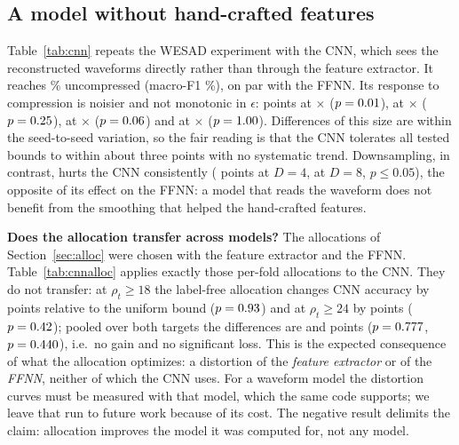 \documentclass[journal]{IEEEtran}
\begin{document}
\subsection{A model without hand-crafted features}
\begin{table}[t]
\caption{WESAD, 1-D CNN on raw reconstructed waveforms (LOSO, 15 subjects, \cnnNSeeds{} seeds).}
\label{tab:cnn}
\centering\scriptsize
\resizebox{\columnwidth}{!}{}
\end{table}
Table~\ref{tab:cnn} repeats the WESAD experiment with the CNN, which sees the reconstructed waveforms directly rather than through the feature extractor. It reaches \cnnRawAcc\% uncompressed (macro-F1 \cnnRawF\%), on par with the FFNN. Its response to compression is noisier and not monotonic in $\epsilon$: \cnnDAccEb{} points at \ratioEb$\times$ ($p=0.01$), \cnnDAccEd{} at \ratioEd$\times$ ($p=0.25$), \cnnDAccEe{} at \ratioEe$\times$ ($p=0.06$) and \cnnDAccEf{} at \ratioEf$\times$ ($p=1.00$). Differences of this size are within the seed-to-seed variation, so the fair reading is that the CNN tolerates all tested bounds to within about three points with no systematic trend. Downsampling, in contrast, hurts the CNN consistently (\cnnDsDAccD{} points at $D=4$, \cnnDsDAccH{} at $D=8$, $p\le0.05$), the opposite of its effect on the FFNN: a model that reads the waveform does not benefit from the smoothing that helped the hand-crafted features.

\begin{table}[t]
\caption{WESAD: allocations chosen with the feature pipeline evaluated with the CNN (LOSO, \cnnallocNSeeds{} seeds, \cnnallocEpochs{} epochs).}
\label{tab:cnnalloc}
\centering\scriptsize
\resizebox{\columnwidth}{!}{}
\end{table}
\textbf{Does the allocation transfer across models?} The allocations of Section~\ref{sec:alloc} were chosen with the feature extractor and the FFNN. Table~\ref{tab:cnnalloc} applies exactly those per-fold allocations to the CNN. They do not transfer: at $\rho_t\ge18$ the label-free allocation changes CNN accuracy by \cnnallocFeatDiffAH{} points relative to the uniform bound ($p=0.93$) and at $\rho_t\ge24$ by \cnnallocFeatDiffBD{} points ($p=0.42$); pooled over both targets the differences are \cnnallocFeatPooledDiff{} and \cnnallocClfPooledDiff{} points ($p=0.777$, $p=0.440$), i.e.\ no gain and no significant loss. This is the expected consequence of what the allocation optimizes: a distortion of the \emph{feature extractor} or of the \emph{FFNN}, neither of which the CNN uses. For a waveform model the distortion curves must be measured with that model, which the same code supports; we leave that run to future work because of its cost. The negative result delimits the claim: allocation improves the model it was computed for, not any model.
\end{document}
